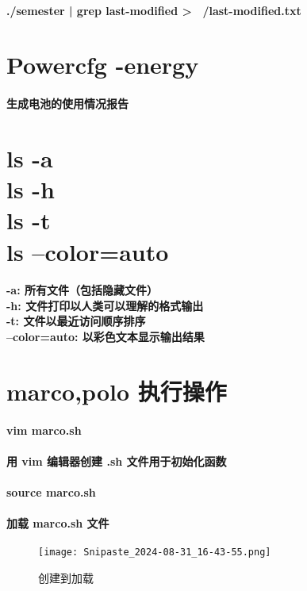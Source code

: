 \documentclass[a4paper, 12pt]{article}
\begin{document}
    \paragraph{./semester | grep last-modified > ~/last-modified.txt}

    \section{Powercfg -energy}
    \paragraph{生成电池的使用情况报告}

    \section{ls -a\\
    ls -h\\
    ls -t\\
    ls --color=auto}
    \paragraph{-a: 所有文件（包括隐藏文件）\\
    -h: 文件打印以人类可以理解的格式输出\\
    -t: 文件以最近访问顺序排序\\
    --color=auto: 以彩色文本显示输出结果}
    \newpage
    
    \section{marco,polo 执行操作}
    \paragraph{vim marco.sh}
    \paragraph{用 vim 编辑器创建 .sh 文件用于初始化函数}
    \paragraph{source marco.sh}
    \paragraph{加载 marco.sh 文件}
    \begin{figure}[h]
        \centering
        \texttt{[image: Snipaste\_2024-08-31\_16-43-55.png]}
        \caption{创建到加载}
        \label{fig:创建到加载}
    \end{figure}
\end{document}
